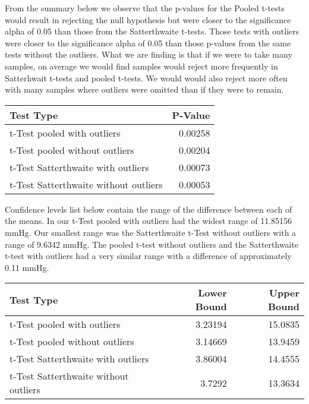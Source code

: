 \documentclass[
]{article}
\begin{document}
From the summary below we observe that the p-values for the Pooled
t-tests would result in rejecting the null hypothesis but were closer to
the significance alpha of 0.05 than those from the Satterthwaite
t-tests. Those tests with outliers were closer to the significance alpha
of 0.05 than those p-values from the same tests without the outliers.
What we are finding is that if we were to take many samples, on average
we would find samples would reject more frequently in Satterhwait
t-tests and pooled t-tests. We would would also reject more often with
many samples where outliers were omitted than if they were to remain.

\begin{longtable}[]{@{}lr@{}}
\toprule
Test Type & P-Value \\
\midrule
\endhead
t-Test pooled with outliers & 0.00258 \\
t-Test pooled without outliers & 0.00204 \\
t-Test Satterthwaite with outliers & 0.00073 \\
t-Test Satterthwaite without outliers & 0.00053 \\
\bottomrule
\end{longtable}

Confidence levels list below contain the range of the difference between
each of the means. In our t-Test pooled with outliers had the widest
range of 11.85156 mmHg. Our smallest range was the Satterthwaite t-Test
without outliers with a range of 9.6342 mmHg. The pooled t-test without
outliers and the Satterthwaite t-test with outliers had a very similar
range with a difference of approximately 0.11 mmHg.

\begin{longtable}[]{@{}lrr@{}}
\toprule
Test Type & Lower Bound & Upper Bound \\
\midrule
\endhead
t-Test pooled with outliers & 3.23194 & 15.0835 \\
t-Test pooled without outliers & 3.14669 & 13.9459 \\
t-Test Satterthwaite with outliers & 3.86004 & 14.4555 \\
t-Test Satterthwaite without outliers & 3.7292 & 13.3634 \\
\bottomrule
\end{longtable}
\end{document}
